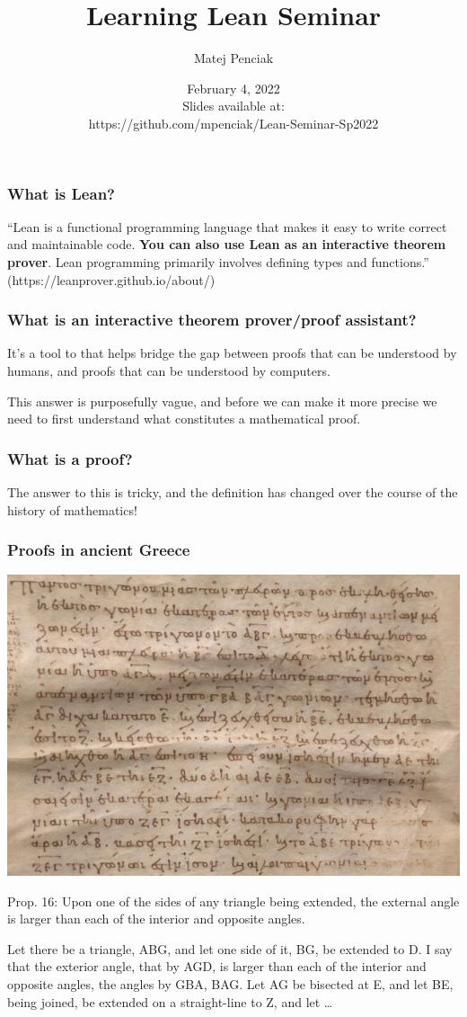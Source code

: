 \documentclass{beamer}
\title{Learning Lean Seminar}
\author{Matej Penciak}
\institute{Northeastern University}
\date{February 4, 2022 \\ Slides available at: \\ https://github.com/mpenciak/Lean-Seminar-Sp2022}
\begin{document}
\frame{\titlepage}

\begin{frame}
    \frametitle{What is Lean?}
    \pause
    ``Lean is a functional programming language that makes it easy to write correct and maintainable code. {\bf You can also use Lean as an interactive theorem prover}. Lean programming primarily involves defining types and functions.''
    (https://leanprover.github.io/about/)
\end{frame}


\begin{frame}
    \frametitle{What is an interactive theorem prover/proof assistant?}
    \pause
    It's a tool to that helps bridge the gap between proofs that can be understood by humans, and proofs that can be understood by computers.

    \vspace{20pt}
    \pause
    This answer is purposefully vague, and before we can make it more precise we need to first understand what constitutes a mathematical proof.
\end{frame}

\begin{frame}
    \frametitle{What is a proof?}
    \pause
    The answer to this is tricky, and the definition has changed over the course of the history of mathematics!
\end{frame}

\begin{frame}
    \frametitle{Proofs in ancient Greece}
    \begin{center}
        \includegraphics[scale=.3]{img/elements.png}
    \end{center}

    \pause
    Prop. 16: Upon one of the sides of any triangle being extended, the external angle is larger than each of the interior and opposite angles.
    
    Let there be a triangle, ABG, and let one side of it, BG, be extended to D. I say that the exterior angle, that by AGD, is larger than each of the interior and opposite angles, the angles by GBA, BAG. Let AG be bisected at E, and let BE, being joined, be extended on a straight-line to Z, and let \ldots
\end{frame}
\end{document}
